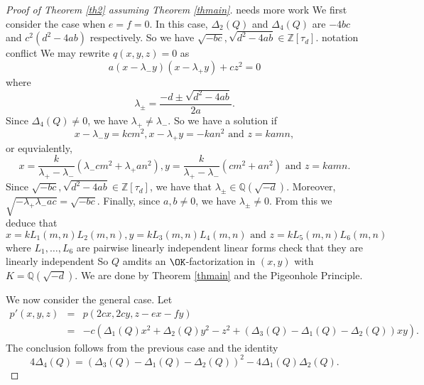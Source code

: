 \documentclass[11pt]{amsart}
\theoremstyle{definition}
\newcommand{\Q}{{\mathbb Q}}
\newcommand{\Z}{{\mathbb Z}}
\begin{document}
\begin{proof}[Proof of Theorem \ref{th2} assuming Theorem \ref{thmain}]

    
{\color{red} needs more work}
    We first consider the case when $e=f=0$. In this case, $\Delta_{2}(Q)$ and $\Delta_{4}(Q)$ are $-4bc$ and $c^{2}(d^{2}-4ab)$ respectively. So we have $\sqrt{-bc}, \sqrt{d^{2}-4ab}\in\Z[\tau_{d}]$. {\color{red} notation conflict }
    We may rewrite $q(x,y,z)=0$ as 
    $$a(x-\lambda_{-}y)(x-\lambda_{+}y)+cz^{2}=0$$
    where
    $$\lambda_{\pm}=\frac{-d\pm\sqrt{d^{2}-4ab}}{2a}.$$
    Since $\Delta_{4}(Q)\neq 0$, we have $\lambda_{+}\neq \lambda_{-}$.
    So we have a solution if 
    $$x-\lambda_{-}y=kcm^{2}, x-\lambda_{+}y=-kan^{2} \text{ and } z=kamn,$$
    or equvialently,
     $$x=\frac{k}{\lambda_{+}-\lambda_{-}}(\lambda_{-}cm^{2}+\lambda_{+}an^{2}), y=\frac{k}{\lambda_{+}-\lambda_{-}}(cm^{2}+an^{2})  \text{ and } z=kamn.$$
    Since $\sqrt{-bc}, \sqrt{d^{2}-4ab}\in\Z[\tau_{d}]$, we have that $\lambda_{\pm}\in \Q(\sqrt{-d})$.  
   Moreover, $\sqrt{-\lambda_{+}\lambda_{-}ac}=\sqrt{-bc}$. Finally, since $a,b\neq 0$, we have $\lambda_{\pm}\neq 0$. From this we deduce that
     $$x=kL_{1}(m,n)L_{2}(m,n), y=kL_{3}(m,n)L_{4}(m,n)  \text{ and } z=kL_{5}(m,n)L_{6}(m,n)$$
     where $L_{1},\dots,L_{6}$ are pairwise linearly independent linear forms {\color{red} check that they are linearly independent}
   So
   $Q$ amdits an $\OK$-factorization in $(x,y)$ with $K=\Q(\sqrt{-d})$. We are done by Theorem \ref{thmain} and the Pigeonhole Principle.

     

    We now consider the general case.
    Let 
    \begin{eqnarray*}
        p'(x,y,z) & = & p(2cx,2cy,z-ex-fy) \\
        & = &-c\left(\Delta_{1}(Q)x^{2}+\Delta_{2}(Q)y^{2}-z^{2}+(\Delta_{3}(Q)-\Delta_{1}(Q)-\Delta_{2}(Q))xy\right).
    \end{eqnarray*}
    The conclusion follows from the previous case and the identity 
    $$4\Delta_{4}(Q)=(\Delta_{3}(Q)-\Delta_{1}(Q)-\Delta_{2}(Q))^{2}-4\Delta_{1}(Q)\Delta_{2}(Q).$$
\end{proof}

\fi
\end{document}
